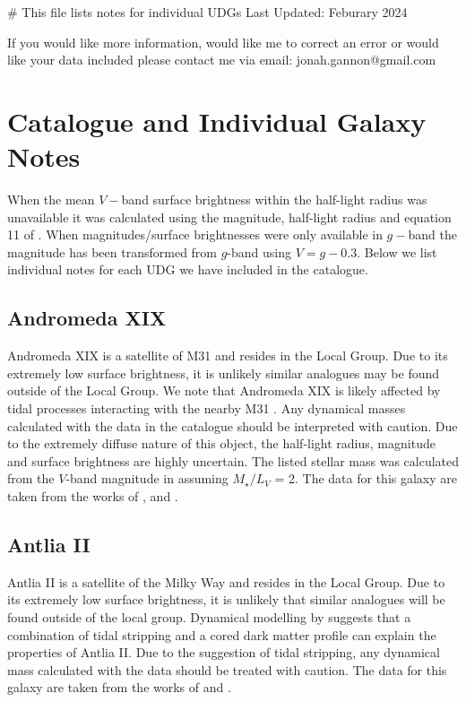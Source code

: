# This file lists notes for individual UDGs 
Last Updated: Feburary 2024

If you would like more information, would like me to correct an error or would like your data included please contact me via email:
jonah.gannon@gmail.com

\section{Catalogue and Individual Galaxy Notes} \label{sec:catalogue}
When the mean $V-$band surface brightness within the half-light radius was unavailable it was calculated using the magnitude, half-light radius and equation 11 of \citet{Graham2005}.  When magnitudes/surface brightnesses were only available in $g-$band the magnitude has been transformed from $g$-band using $V=g-0.3$. Below we list individual notes for each UDG we have included in the catalogue.

\subsection{Andromeda XIX}
Andromeda XIX is a satellite of M31 and resides in the Local Group. Due to its extremely low surface brightness, it is unlikely similar analogues may be found outside of the Local Group. We note that Andromeda XIX is likely affected by tidal processes interacting with the nearby M31 \citep{Collins2020, Collins2022}. Any dynamical masses calculated with the data in the catalogue should be interpreted with caution. Due to the extremely diffuse nature of this object, the half-light radius, magnitude and surface brightness are highly uncertain. The listed stellar mass was calculated from the $V$-band magnitude in \citet{Martin2016} assuming $M_{\star}/L_{V}$ = 2. The data for this galaxy are taken from the works of \citet{Martin2016}, \citet{Collins2020} and \citet{Gannon2021}.

\subsection{Antlia II}
Antlia II is a satellite of the Milky Way and resides in the Local Group. Due to its extremely low surface brightness, it is unlikely that similar analogues will be found outside of the local group. Dynamical modelling by \citet{torrealba2019} suggests that a combination of tidal stripping and a cored dark matter profile can explain the properties of Antlia II. Due to the suggestion of tidal stripping, any dynamical mass calculated with the data should be treated with caution. The data for this galaxy are taken from the works of \citet{mcconnachie2012} and \citet{torrealba2019}.

